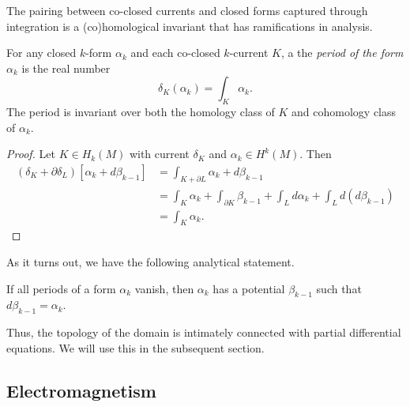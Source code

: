 \documentclass[conf]{new-aiaa}
\begin{document}
The pairing between co-closed currents and closed forms captured through integration is a (co)homological invariant that has ramifications in analysis.
\begin{proposition}
\label{def:period}
For any closed $k$-form $\alpha_k$ and each co-closed $k$-current $K$, a the \emph{period of the form $\alpha_k$} is the real number
\begin{equation}
\delta_K(\alpha_k)=\int_K \alpha_k.
\end{equation}
The period is invariant over both the homology class of $K$ and cohomology class of $\alpha_k$.
\end{proposition}
\begin{proof}
Let $K \in H_k(M)$ with current $\delta_K$ and $\alpha_k \in H^k(M)$. Then
\begin{align}
(\delta_K+\partial \delta_L)[\alpha_k + d \beta_{k-1}] &= \int_{K+\partial L} \alpha_k + d\beta_{k-1}\\
&= \int_K \alpha_k + \int_{\partial K} \beta_{k-1} + \int_L d \alpha_k + \int_L d(d\beta_{k-1})\\
&= \int_K \alpha_k.
\end{align}
\end{proof}
As it turns out, we have the following analytical statement.
\begin{proposition}
\label{prop:periods}
    If all periods of a form $\alpha_k$ vanish, then $\alpha_k$ has a potential $\beta_{k-1}$ such that $d\beta_{k-1}=\alpha_k$.
\end{proposition}
Thus, the topology of the domain is intimately connected with partial differential equations. We will use this in the subsequent section.

\subsection{Electromagnetism}
\end{document}
